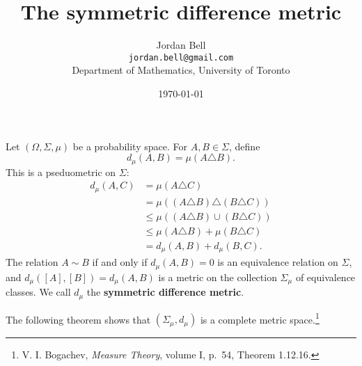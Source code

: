 \documentclass{article}
\theoremstyle{definition}
\begin{document}
\title{The symmetric difference metric}
\author{Jordan Bell\\ \texttt{jordan.bell@gmail.com}\\Department of Mathematics, University of Toronto}
\date{\today}

\maketitle

Let $(\Omega,\Sigma,\mu)$ be a probability space. 
For $A,B \in \Sigma$, define 
\[
d_\mu(A,B) = \mu(A \triangle B).
\]
This is a pseduometric on $\Sigma$: 
\begin{align*}
d_\mu(A,C)&=\mu( A \triangle C)\\
&=\mu((A \triangle B) \triangle (B \triangle C))\\
&\leq \mu((A \triangle B) \cup (B \triangle C))\\
&\leq \mu(A \triangle B) + \mu(B \triangle C)\\
&=d_\mu(A,B)+d_\mu(B,C).
\end{align*}
The relation $A \sim B$ if and only if
$d_\mu(A,B)=0$ is an equivalence relation on $\Sigma$, and
$d_\mu([A],[B])=d_\mu(A,B)$ is a metric on the collection $\Sigma_\mu$ of equivalence classes.
We call $d_\mu$ the \textbf{symmetric difference metric}.

The following theorem shows that
$(\Sigma_\mu,d_\mu)$ is a complete metric space.\footnote{V. I. Bogachev, {\em Measure Theory}, volume I,
p.~54, Theorem 1.12.16.}
\end{document}
